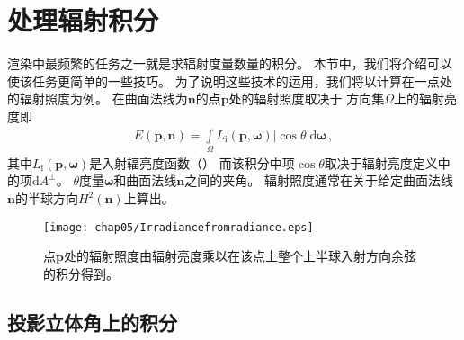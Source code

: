 \section{处理辐射积分}\label{sec:处理辐射积分}

渲染中最频繁的任务之一就是求辐射度量数量的积分。
本节中，我们将介绍可以使该任务更简单的一些技巧。
为了说明这些技术的运用，我们将以计算在一点处的辐射照度为例。
在曲面法线为$\bm n$的点$\bm p$处的辐射照度取决于
方向集$\Omega$上的辐射亮度即
\begin{align}\label{eq:5.4}
    E({\bm p},{\bm n})=\int\limits_{\Omega}{L_{\mathrm{i}}({\bm p},{\bm\omega})|\cos\theta|\mathrm{d}\bm\omega}\, ,
\end{align}
其中$L_{\mathrm{i}}({\bm p},{\bm\omega})$是入射辐亮度函数（）
而该积分中项$\cos\theta$取决于辐射亮度定义中的项$\mathrm{d}A^{\perp}$。
$\theta$度量$\bm\omega$和曲面法线$\bm n$之间的夹角。
辐射照度通常在关于给定曲面法线$\bm n$的半球方向$H^2(\bm n)$上算出。
\begin{figure}[htbp]
    \centering\texttt{[image: chap05/Irradiancefromradiance.eps]}
    \caption{点$\bm p$处的辐射照度由辐射亮度乘以在该点上整个上半球入射方向余弦的积分得到。}
    \label{fig:5.12}
\end{figure}

\subsection{投影立体角上的积分}\label{sub:投影立体角上的积分}
